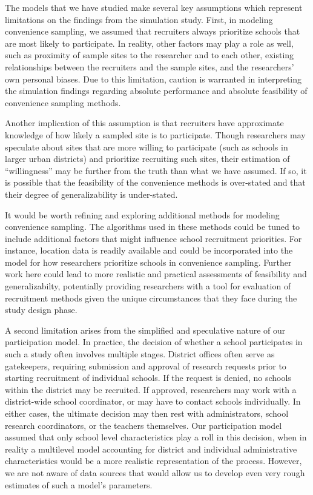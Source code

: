\documentclass[
  english,
  man,floatsintext]{apa6}
\begin{document}
The models that we have studied make several key assumptions which represent limitations on the findings from the simulation study. First, in modeling convenience sampling, we assumed that recruiters always prioritize schools that are most likely to participate. In reality, other factors may play a role as well, such as proximity of sample sites to the researcher and to each other, existing relationships between the recruiters and the sample sites, and the researchers' own personal biases.
Due to this limitation, caution is warranted in interpreting the simulation findings regarding absolute performance and absolute feasibility of convenience sampling methods.

Another implication of this assumption is that recruiters have approximate knowledge of how likely a sampled site is to participate. Though researchers may speculate about sites that are more willing to participate (such as schools in larger urban districts) and prioritize recruiting such sites, their estimation of ``willingness'' may be further from the truth than what we have assumed. If so, it is possible that the feasibility of the convenience methods is over-stated and that their degree of generalizability is under-stated.

It would be worth refining and exploring additional methods for modeling convenience sampling. The algorithms used in these methods could be tuned to include additional factors that might influence school recruitment priorities. For instance, location data is readily available and could be incorporated into the model for how researchers prioritize schools in convenience sampling. Further work here could lead to more realistic and practical assessments of feasibility and generalizabilty, potentially providing researchers with a tool for evaluation of recruitment methods given the unique circumstances that they face during the study design phase.

A second limitation arises from the simplified and speculative nature of our participation model. In practice, the decision of whether a school participates in such a study often involves multiple stages. District offices often serve as gatekeepers, requiring submission and approval of research requests prior to starting recruitment of individual schools. If the request is denied, no schools within the district may be recruited. If approved, researchers may work with a district-wide school coordinator, or may have to contact schools individually. In either cases, the ultimate decision may then rest with administrators, school research coordinators, or the teachers themselves. Our participation model assumed that only school level characteristics play a roll in this decision, when in reality a multilevel model accounting for district and individual administrative characteristics would be a more realistic representation of the process. However, we are not aware of data sources that would allow us to develop even very rough estimates of such a model's parameters.
\end{document}
